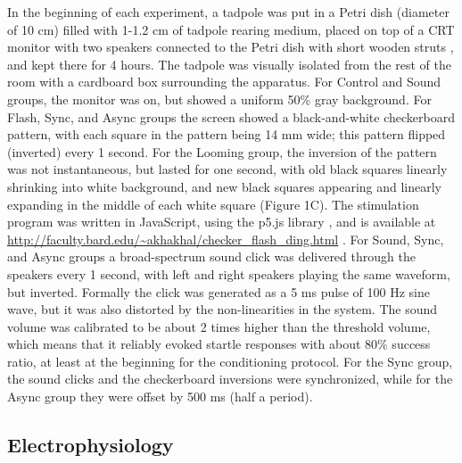 \documentclass{article}
\begin{document}
In the beginning of each experiment, a tadpole was put in a Petri dish (diameter of 10 cm) filled with 1-1.2 cm of tadpole rearing medium, placed on top of a CRT monitor with two speakers connected to the Petri dish with short wooden struts \citep{james2015,truszkowski2017}, and kept there for 4 hours. The tadpole was visually isolated from the rest of the room with a cardboard box surrounding the apparatus. For Control and Sound groups, the monitor was on, but showed a uniform 50\% gray background. For Flash, Sync, and Async groups the screen showed a black-and-white checkerboard pattern, with each square in the pattern being 14 mm wide; this pattern flipped (inverted) every 1 second. For the Looming group, the inversion of the pattern was not instantaneous, but lasted for one second, with old black squares linearly shrinking into white background, and new black squares appearing and linearly expanding in the middle of each white square (Figure 1C). The stimulation program was written in JavaScript, using the p5.js library \citep{mccarthy2015}, and is available at \url{http://faculty.bard.edu/~akhakhal/checker_flash_ding.html} . For Sound, Sync, and Async groups a broad-spectrum sound click was delivered through the speakers every 1 second, with left and right speakers playing the same waveform, but inverted. Formally the click was generated as a 5 ms pulse of 100 Hz sine wave, but it was also distorted by the non-linearities in the system. The sound volume was calibrated to be about 2 times higher than the threshold volume, which means that it reliably evoked startle responses with about 80\% success ratio, at least at the beginning for the conditioning protocol. For the Sync group, the sound clicks and the checkerboard inversions were synchronized, while for the Async group they were offset by 500 ms (half a period).

\subsection*{Electrophysiology}
\end{document}
